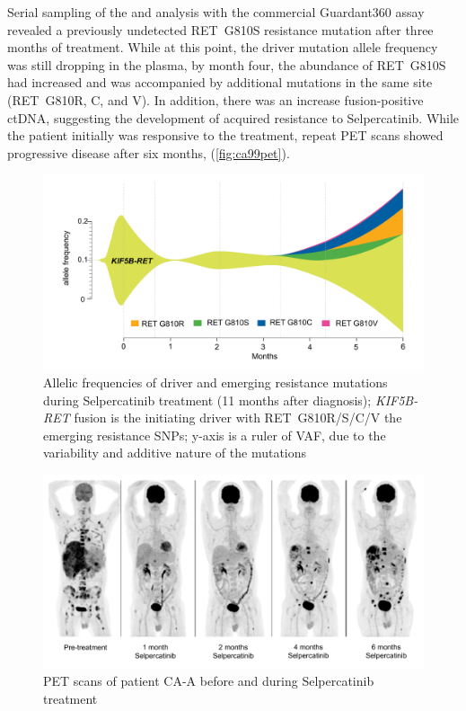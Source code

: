 Serial sampling of the  and analysis with the commercial Guardant360 assay \cite{Talasaz2014} revealed a previously undetected RET~G810S resistance mutation after three months of treatment. While at this point, the driver mutation allele frequency was still dropping in the plasma, by month four, the abundance of RET~G810S had increased and was accompanied by additional mutations in the same site (RET~G810R, C, and V). In addition, there was an increase  fusion-positive ctDNA,  suggesting the development of acquired resistance to Selpercatinib. While the patient initially was responsive to the treatment, repeat PET scans showed progressive disease after six months,  (\autoref{fig:ca99pet}).

\begin{figure}[htp]
\centering
\includegraphics[width=.99\linewidth]{Figures/CASCADE/CA99/CA-A_ctDNAstream}
\caption[Allelic frequencies of driver and emerging resistance mutations]{Allelic frequencies of driver and emerging resistance mutations during Selpercatinib treatment (11 months after diagnosis); \textit{KIF5B-RET} fusion is the initiating driver with RET~G810R/S/C/V the emerging resistance SNPs; y-axis is a ruler of VAF, due to the variability and additive nature of the mutations} \label{fig:ca99ctDNA}
\end{figure}


\begin{figure}[hbp]
\centering
\includegraphics[width=.99\linewidth]{Figures/CASCADE/CA99/CA-A_PETscans}
\caption[PET scans of patient CA-A before and during Selpercatinib treatment]{PET scans of patient CA-A before and during Selpercatinib treatment} \label{fig:ca99pet}
\end{figure}


